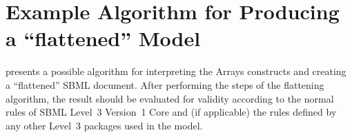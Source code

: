 









\section{Example Algorithm for Producing a ``flattened'' Model}
\label{flatten}
 presents a possible algorithm for interpreting the
Arrays constructs and creating a ``flattened''
SBML document. After performing the steps of the
flattening algorithm, the result should be evaluated for validity
according to the normal rules of SBML Level~3 Version~1 Core and (if
applicable) the rules defined by any other Level~3 packages used in the
model.


